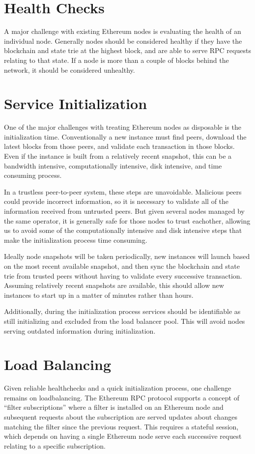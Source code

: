 \documentclass[letterpaper,10pt,english]{sphinxmanual}
\begin{document}
\section{Health Checks}
\label{\detokenize{topics/goals:health-checks}}
A major challenge with existing Ethereum nodes is evaluating the health of an
individual node. Generally nodes should be considered healthy if they have the
blockchain and state trie at the highest block, and are able to serve RPC
requests relating to that state. If a node is more than a couple of blocks
behind the network, it should be considered unhealthy.


\section{Service Initialization}
\label{\detokenize{topics/goals:initialization}}\label{\detokenize{topics/goals:service-initialization}}
One of the major challenges with treating Ethereum nodes as disposable is the
initialization time. Conventionally a new instance must find peers, download
the latest blocks from those peers, and validate each transaction in those
blocks. Even if the instance is built from a relatively recent snapshot, this
can be a bandwidth intensive, computationally intensive, disk intensive, and
time consuming process.

In a trustless peer-to-peer system, these steps are unavoidable. Malicious
peers could provide incorrect information, so it is necessary to validate all
of the information received from untrusted peers. But given several nodes
managed by the same operator, it is generally safe for those nodes to trust
eachother, allowing us to avoid some of the computationally intensive and disk
intensive steps that make the initialization process time consuming.

Ideally node snapshots will be taken periodically, new instances will launch
based on the most recent available snapshot, and then sync the blockchain and
state trie from trusted peers without having to validate every successive
transaction. Assuming relatively recent snapshots are available, this should
allow new instances to start up in a matter of minutes rather than hours.

Additionally, during the initialization process services should be identifiable
as still initializing and excluded from the load balancer pool. This will
avoid nodes serving outdated information during initialization.


\section{Load Balancing}
\label{\detokenize{topics/goals:load-balancing}}
Given reliable healthchecks and a quick initialization process, one challenge
remains on loadbalancing. The Ethereum RPC protocol supports a concept of
“filter subscriptions” where a filter is installed on an Ethereum node and
subsequent requests about the subscription are served updates about changes
matching the filter since the previous request. This requires a stateful
session, which depends on having a single Ethereum node serve each successive
request relating to a specific subscription.
\end{document}
